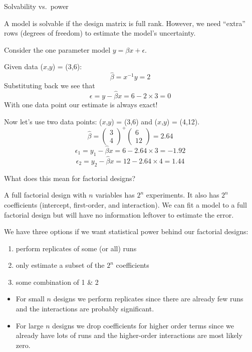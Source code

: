 \documentclass[10pt]{beamer}
\begin{document}
\begin{frame}{Solvability vs.\ power}

A model is solvable if the design matrix is full rank. However, we need ``extra'' rows (degrees of freedom) to estimate the model's uncertainty.

\medskip
Consider the one parameter model $y = \beta x + \epsilon$. 

Given data ($x$,$y$) = (3,6):
\[ \hat{\beta} = x^{-1}y = 2 \]
\pause
Substituting back we see that
\[ \epsilon = y - \hat{\beta} x = 6 - 2\times 3 = 0 \]
With one data point our estimate is always exact!

\pause
Now let's use two data points: ($x$,$y$) = (3,6) and ($x$,$y$) = (4,12).
\[ \hat{\beta} = \begin{pmatrix} 3\\4 \end{pmatrix}^+ \begin{pmatrix} 6\\12 \end{pmatrix} = 2.64 \]
\[ \epsilon_1 = y_1 - \hat{\beta} x = 6 - 2.64\times 3 = -1.92 \]
\[ \epsilon_2 = y_2 - \hat{\beta} x = 12 - 2.64\times 4 = 1.44 \]
\end{frame}

\begin{frame}{What does this mean for factorial designs?}

A full factorial design with $n$ variables has $2^n$ experiments. It also has $2^n$ coefficients (intercept, first-order, and interaction). We can fit a model to a full factorial design but will have no information leftover to estimate the error.

\medskip
We have three options if we want statistical power behind our factorial designs:

\begin{enumerate}
	\item perform replicates of some (or all) runs
	\item only estimate a subset of the $2^n$ coefficients
	\item some combination of 1 \& 2
\end{enumerate}

\pause
\begin{itemize}
	\item For small $n$ designs we perform replicates since there are already few runs and the interactions are probably significant.
	\item For large $n$ designs we drop coefficients for higher order terms since we already have lots of runs and the higher-order interactions are most likely zero.
\end{itemize}
\end{frame}
\end{document}

